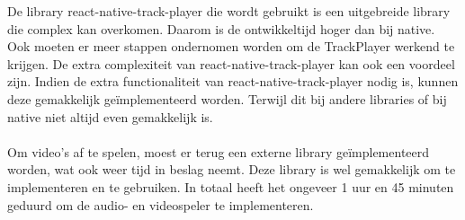 De library react-native-track-player die wordt gebruikt is een uitgebreide library
die complex kan overkomen. Daarom is de ontwikkeltijd hoger dan bij native.
Ook moeten er meer stappen ondernomen worden om de TrackPlayer werkend te krijgen.
De extra complexiteit van react-native-track-player kan ook een voordeel zijn. Indien de
extra functionaliteit van react-native-track-player nodig is, kunnen deze gemakkelijk geïmplementeerd worden.
Terwijl dit bij andere libraries of bij native niet altijd even gemakkelijk is.
\\\\
Om video's af te spelen, moest er terug een externe library geïmplementeerd worden, wat ook weer
tijd in beslag neemt. Deze library is wel gemakkelijk om te implementeren en te gebruiken.
In totaal heeft het ongeveer 1 uur en 45 minuten geduurd om de audio- en videospeler te implementeren.

